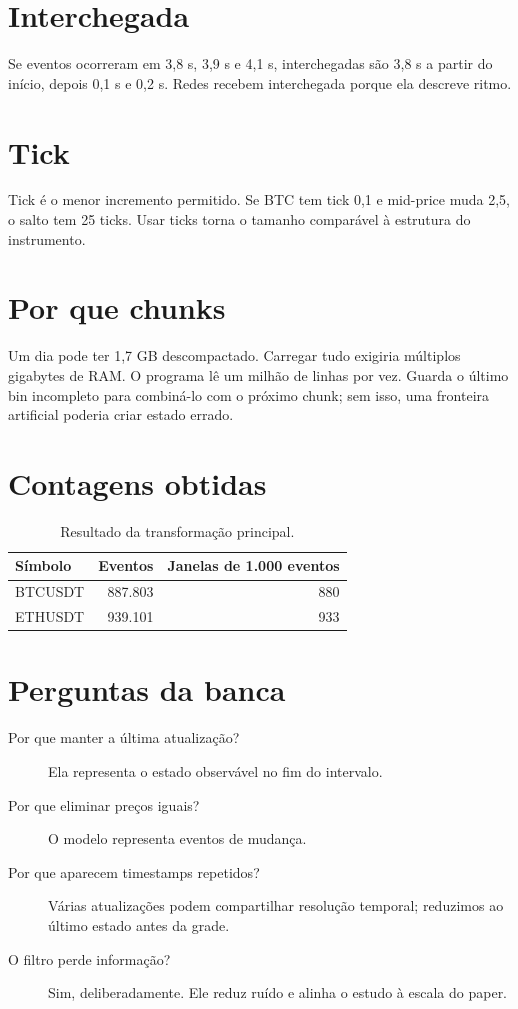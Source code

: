 \documentclass[12pt,a4paper,openany]{report}
\begin{document}
\section{Interchegada}

Se eventos ocorreram em 3,8 s, 3,9 s e 4,1 s, interchegadas são 3,8 s a partir do
início, depois 0,1 s e 0,2 s. Redes recebem interchegada porque ela descreve ritmo.

\section{Tick}

Tick é o menor incremento permitido. Se BTC tem tick 0,1 e mid-price muda 2,5,
o salto tem 25 ticks. Usar ticks torna o tamanho comparável à estrutura do instrumento.

\section{Por que chunks}

Um dia pode ter 1,7 GB descompactado. Carregar tudo exigiria múltiplos gigabytes de RAM.
O programa lê um milhão de linhas por vez. Guarda o último bin incompleto para combiná-lo
com o próximo chunk; sem isso, uma fronteira artificial poderia criar estado errado.

\section{Contagens obtidas}

\begin{table}[ht]
\centering
\caption{Resultado da transformação principal.}
\begin{tabular}{lrr}
\toprule
Símbolo & Eventos & Janelas de 1.000 eventos\\
\midrule
BTCUSDT & 887.803 & 880\\
ETHUSDT & 939.101 & 933\\
\bottomrule
\end{tabular}
\end{table}

\section{Perguntas da banca}

\begin{description}
  \item[Por que manter a última atualização?] Ela representa o estado observável no
  fim do intervalo.
  \item[Por que eliminar preços iguais?] O modelo representa eventos de mudança.
  \item[Por que aparecem timestamps repetidos?] Várias atualizações podem compartilhar
  resolução temporal; reduzimos ao último estado antes da grade.
  \item[O filtro perde informação?] Sim, deliberadamente. Ele reduz ruído e alinha o
  estudo à escala do paper.
\end{description}
\end{document}
